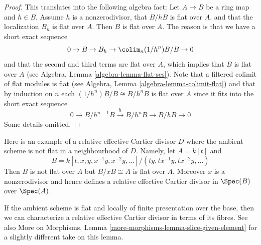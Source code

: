 \begin{proof}
This translates into the following algebra fact:
Let $A \to B$ be a ring map and $h \in B$.
Assume $h$ is a nonzerodivisor, that $B/hB$ is flat over $A$, and
that the localization $B_h$ is flat over $A$. Then $B$ is flat over $A$.
The reason is that we have a short exact sequence
$$
0 \to B \to B_h \to \colim_n (1/h^n)B/B \to 0
$$
and that the second and third terms are flat over $A$, which implies
that $B$ is flat over $A$ (see
Algebra, Lemma \ref{algebra-lemma-flat-ses}). Note that a filtered
colimit of flat modules is flat (see
Algebra, Lemma \ref{algebra-lemma-colimit-flat})
and that by induction on $n$ each $(1/h^n)B/B \cong B/h^nB$ is flat over
$A$ since it fits into the short exact sequence
$$
0 \to B/h^{n - 1}B \xrightarrow{h} B/h^nB \to B/hB \to 0
$$
Some details omitted.
\end{proof}

\begin{example}
\label{example-relative-cartier-ambient-space-not-flat}
Here is an example of a relative effective Cartier divisor $D$ where the
ambient scheme is not flat in a neighbourhood of $D$. Namely, let
$A = k[t]$ and
$$
B = k[t, x, y, x^{-1}y, x^{-2}y, \ldots]/(ty, tx^{-1}y, tx^{-2}y, \ldots)
$$
Then $B$ is not flat over $A$ but $B/xB \cong A$ is flat over $A$.
Moreover $x$ is a nonzerodivisor and hence defines a relative effective
Cartier divisor in $\Spec(B)$ over $\Spec(A)$.
\end{example}

\noindent
If the ambient scheme is flat and locally of finite presentation over
the base, then we can characterize a relative effective Cartier divisor
in terms of its fibres. See also
More on Morphisms, Lemma \ref{more-morphisms-lemma-slice-given-element}
for a slightly different take on this lemma.

